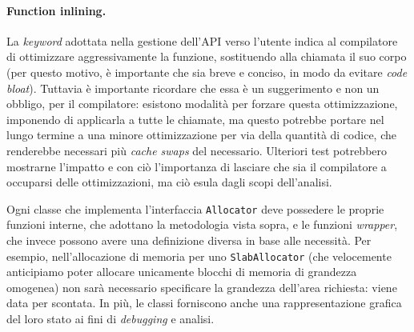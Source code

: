 \paragraph{Function inlining.}
La \textit{keyword} adottata nella gestione dell'API verso l'utente indica al compilatore di ottimizzare aggressivamente la funzione, sostituendo alla chiamata il suo corpo (per questo motivo, è importante che sia breve e conciso, in modo da evitare \textit{code bloat}). Tuttavia è importante ricordare che essa è un suggerimento e non un obbligo, per il compilatore: esistono modalità per forzare questa ottimizzazione, imponendo di applicarla a tutte le chiamate, ma questo potrebbe portare nel lungo termine a una minore ottimizzazione per via della quantità di codice, che renderebbe necessari più \textit{cache swaps} del necessario. Ulteriori test potrebbero mostrarne l’impatto e con ciò l’importanza di lasciare che sia il compilatore a occuparsi delle ottimizzazioni, ma ciò esula dagli scopi dell’analisi.

Ogni classe che implementa l’interfaccia \texttt{Allocator} deve possedere le proprie funzioni interne, che adottano la metodologia vista sopra, e le funzioni \textit{wrapper}, che invece possono avere una definizione diversa in base alle necessità. Per esempio, nell’allocazione di memoria per uno \texttt{SlabAllocator} (che velocemente anticipiamo poter allocare unicamente blocchi di memoria di grandezza omogenea) non sarà necessario specificare la grandezza dell’area richiesta: viene data per scontata. In più, le classi forniscono anche una rappresentazione grafica del loro stato ai fini di \textit{debugging} e analisi.

